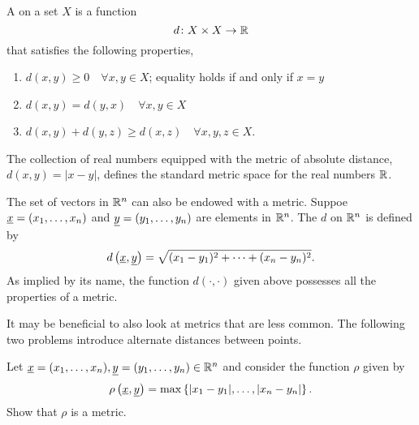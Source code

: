 \begin{definition}
A  on a set $X$ is a function
\begin{equation*}
d \colon X \times X \rightarrow \mathbb{R}
\end{equation*}
that satisfies the following properties,
\begin{enumerate}
\item $d(x,y) \geq 0 \quad \forall x, y \in X$; equality holds if and only if $x = y$
\item $d(x,y) = d(y,x) \quad \forall x, y \in X$
\item $d(x,y) + d(y,z) \geq d(x,z) \quad \forall x, y, z \in X$.
\end{enumerate}
\end{definition}

\begin{example}
The collection of real numbers equipped with the metric of absolute distance, $d(x,y) = |x-y|$, defines the standard metric space for the real numbers $\mathbb{R}$.
\end{example}

\begin{example}
The set of vectors in $\mathbb{R}^n$ can also be endowed with a metric.
Suppoe $\underline{x} = (x_1, \ldots, x_n)$ and $\underline{y} = (y_1, \ldots, y_n)$ are elements in $\mathbb{R}^n$.
The  $d$ on $\mathbb{R}^n$ is defined by
\begin{equation*}
d \left( \underline{x}, \underline{y} \right)
= \sqrt{ (x_1 - y_1)^2 + \cdots + (x_n - y_n)^2 }.
\end{equation*}
As implied by its name, the function $d(\cdot, \cdot)$ given above possesses all the properties of a metric.
\end{example}

It may be beneficial to also look at metrics that are less common.
The following two problems introduce alternate distances between points.

\begin{problem}
Let $\underline{x} = (x_1, \ldots, x_n), \underline{y} = (y_1, \ldots, y_n) \in \mathbb{R}^n$ and consider the function $\rho$ given by
\begin{equation*}
\rho \left( \underline{x}, \underline{y} \right)
= \max \left\{ |x_1 - y_1|, \ldots, |x_n - y_n| \right\}.
\end{equation*}
Show that $\rho$ is a metric.
\end{problem}

